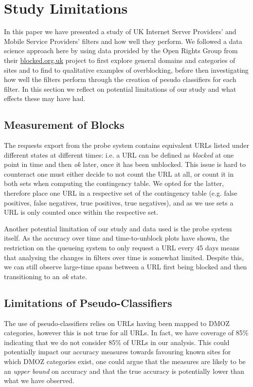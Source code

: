 \documentclass{bmcart}
\begin{document}
\begin{figure}[h!]
\label{fig:isps-unblock-dist}
\end{figure}



\section*{Study Limitations}
In this paper we have presented a study of UK Internet Server Providers' and Mobile Service Providers' filters and how well they perform.
We followed a data science approach here by using data provided by the Open Rights Group from their \url{blocked.org.uk} project to first explore general domains and categories of sites and to find to qualitative examples of overblocking, before then investigating how well the filters perform through the creation of pesudo classifiers for each filter.
In this section we reflect on potential limitations of our study and what effects these may have had.

\subsection*{Measurement of Blocks}
The requests export from the probe system contains equivalent URLs listed under different states at different times: i.e. a URL can be defined as \textit{blocked} at one point in time and then \textit{ok} later, once it has been unblocked.
This issue is hard to counteract one must either decide to not count the URL at all, or count it in both sets when computing the contingency table.
We opted for the latter, therefore place one URL in a respective set of the contingency table (e.g. false positives, false negatives, true positives, true negatives), and as we use sets a URL is only counted once within the respective set.

Another potential limitation of our study and data used is the probe system itself. 
As the accuracy over time and time-to-unblock plots have shown, the restriction on the queueing system to only request a URL every 45 days means that analysing the changes in filters over time is somewhat limited.
Despite this, we can still observe large-time spans between a URL first being blocked and then transitioning to an \textit{ok} state.

\subsection*{Limitations of Pseudo-Classifiers}
The use of pseudo-classifiers relies on URLs having been mapped to DMOZ categories, however this is not true for all URLs.
In fact, we have coverage of 85\% indicating that we do not consider 85\% of URLs in our analysis.
This could potentially impact our accuracy measures towards favouring known sites for which DMOZ categories exist, one could argue that the measures are likely to be an \textit{upper bound} on accuracy and that the true accuracy is potentially lower than what we have observed.
\end{document}
